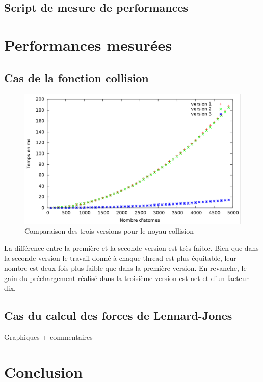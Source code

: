 \documentclass{article}
\begin{document}
\subsection{Script de mesure de performances}

\section{Performances mesurées}

\subsection{Cas de la fonction collision}
\begin{figure}[h]
	\includegraphics[width=\textwidth]{figures/collision.png}
	\caption{Comparaison des trois versions pour le noyau collision}
\end{figure}

La différence entre la première et la seconde version est très faible. Bien
que dans la seconde version le travail donné à chaque thread est plus
équitable, leur nombre est deux fois plus faible que dans la première version.
En revanche, le gain du préchargement réalisé dans la troisième version est
net et d'un facteur dix.

\subsection{Cas du calcul des forces de Lennard-Jones}
Graphiques + commentaires

\section{Conclusion}
\end{document}
